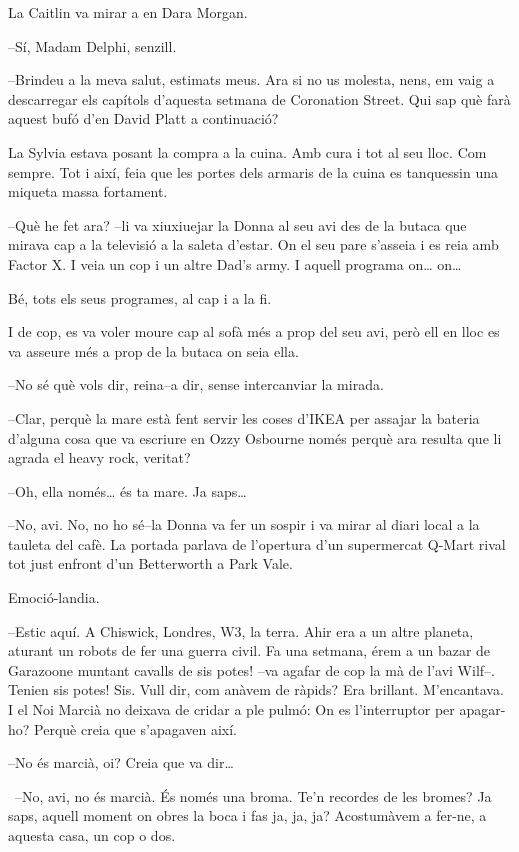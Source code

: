 La Caitlin va mirar a en Dara Morgan.

--Sí, Madam Delphi, senzill.

--Brindeu a la meva salut, estimats meus. Ara si no us molesta, nens, em
vaig a descarregar els capítols d'aquesta setmana de Coronation Street.
Qui sap què farà aquest bufó d'en David Platt a continuació?

La Sylvia estava posant la compra a la cuina. Amb cura i tot al seu
lloc. Com sempre. Tot i així, feia que les portes dels armaris de la
cuina es tanquessin una miqueta massa fortament.

--Què he fet ara? --li va xiuxiuejar la Donna al seu avi des de la
butaca que mirava cap a la televisió a la saleta d'estar. On el seu pare
s'asseia i es reia amb Factor X. I veia un cop i un altre Dad's army. I
aquell programa on\ldots{} on\ldots{}

Bé, tots els seus programes, al cap i a la fi.

I de cop, es va voler moure cap al sofà més a prop del seu avi, però ell
en lloc es va asseure més a prop de la butaca on seia ella.

--No sé què vols dir, reina--a dir, sense intercanviar la mirada.

--Clar, perquè la mare està fent servir les coses d'IKEA per assajar la
bateria d'alguna cosa que va escriure en Ozzy Osbourne només perquè ara
resulta que li agrada el heavy rock, veritat?

--Oh, ella només\ldots{} és ta mare. Ja saps\ldots{}

--No, avi. No, no ho sé--la Donna va fer un sospir i va mirar al diari
local a la tauleta del cafè. La portada parlava de l'opertura d'un
supermercat Q-Mart rival tot just enfront d'un Betterworth a Park Vale.

Emoció-landia.

--Estic aquí. A Chiswick, Londres, W3, la terra. Ahir era a un altre
planeta, aturant un robots de fer una guerra civil. Fa una setmana, érem
a un bazar de Garazoone muntant cavalls de sis potes! --va agafar de cop
la mà de l'avi Wilf--. Tenien sis potes! Sis. Vull dir, com anàvem de
ràpids? Era brillant. M'encantava. I el Noi Marcià no deixava de cridar
a ple pulmó: On es l'interruptor per apagar-ho? Perquè creia que
s'apagaven així.

--No és marcià, oi? Creia que va dir\ldots{}

~--No, avi, no és marcià. És només una broma. Te'n recordes de les
bromes? Ja saps, aquell moment on obres la boca i fas ja, ja, ja?
Acostumàvem a fer-ne, a aquesta casa, un cop o dos.

